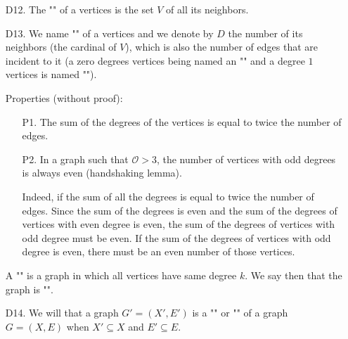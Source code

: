 {\begin{enumerate}
	 Some of these graphs are, as we consider their vertices as indistinguishable, "" (see definition of this term a little bit late below in this section).
	
	This result means that there are about $2$ million of graphs for to $7$ vertices, graphs and almost $4\cdot 10^{105}$ for graphs with 27 vertices - a number to be compare with the fact that we estimate at $10^{100}$ the number of atoms in the universe...
	
	\item[D12.] The "" of a vertices is the set $V$ of all its neighbors.
	
	\item[D13.]  We name "" of a vertices and we denote by $D$ the number of its neighbors (the cardinal of $V$), which is also the number of edges that are incident to it (a zero degrees vertices being named an "" and a degree $1$ vertices is named "").
	
	Properties (without proof):
	\begin{enumerate}
		\item[P1.] The sum of the degrees of the vertices is equal to twice the number of edges.
		
		
		\item[P2.] In a graph such that  $\mathcal{O}>3$, the number of vertices with odd degrees is always even (handshaking lemma).
		
		Indeed, if the sum of all the degrees is equal to twice the number of edges. Since the sum of the degrees is even and the sum of the degrees of vertices with even degree is even, the sum of the degrees of vertices with odd degree must be even. If the sum of the degrees of vertices with odd degree is even, there must be an even number of those vertices.
	\end{enumerate}
	\begin{tcolorbox}[title=Remark,colframe=black,arc=10pt]
	A "" is a graph in which all vertices have same degree $k$. We say then that the graph is "".
	\end{tcolorbox}
	
	\item[D14.] We will that a graph $G'=(X',E')$ is a "" or "" of a graph $G=(X,E)$ when $X' \subseteq X$ and $E' \subseteq E$.
	

\end{enumerate}}
